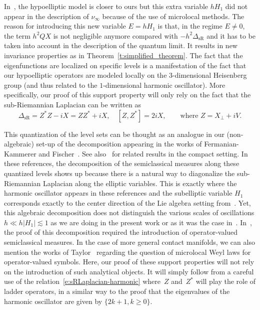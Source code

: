 \documentclass[JEP,XML,SOM,Unicode, NoEqCountersInSection,published]{cedram}
\theoremstyle{plain}
\theoremstyle{definition}
\theoremstyle{remark}
\begin{document}
In~\cite{ColindeVerdiereHillairetTrelat15}, the hypoelliptic model is closer to ours but this extra variable $hH_1$ did not appear in the description of $\nu_\infty$ because of the use of microlocal methods. The reason for introducing this new variable $E=hH_1$ is that, in the regime $E\neq 0$, the term $h^2QX$ is not negligible anymore compared with $-h^2\Delta_{\text{sR}}$ and it has to be taken into account in the description of the quantum limit. It results in new invariance properties as in Theorem~\ref{t:simplified_theorem}. The fact that the eigenfunctions are localized on specific levels is a manifestation of the fact that our hypoelliptic operators are modeled locally on the $3$-dimensional Heisenberg group (and thus related to the $1$\nobreakdash-dimensional harmonic oscillator). More specifically, our proof of this support property will only rely on the fact that the sub-Riemannian Laplacian can be written as
\begin{equation}\label{e:sRLaplacian-harmonic}
\Delta_{\text{sR}}=Z^*Z-iX=ZZ^*+iX,\quad [Z,Z^*]=2iX,\qquad\text{where $Z=X_\perp+i V$.}
\end{equation}

This quantization of the level sets can be thought as an analogue in our (non-algebraic) set-up of the decomposition appearing in the works of Fermanian-Kammerer and Fischer~\cite[Th.\,1.1, Th.\,2.10]{FermanianFischer21}. See also~\cite{FermanianLetrouit20} for related results in the compact setting. In these references, the decomposition of the semiclassical measures along these quantized levels shows up because there is a natural way to diagonalize the sub-Riemannian Laplacian along the elliptic variables. This is exactly where the harmonic oscillator appears in these references and the subelliptic variable $H_1$ corresponds exactly to the center direction of the Lie algebra setting from~\cite{FermanianFischer21, FermanianLetrouit20}. Yet, this algebraic decomposition does not distinguish the various scales of oscillations $h\ll h|H_1|\lesssim 1$ as we are doing in the present work or as it was the case in~\cite{BurqSun22, ArnaizSun22}. In~\cite{FermanianFischer21, FermanianLetrouit20}, the proof of this decomposition required the introduction of operator-valued semiclassical measures. In the case of more general contact manifolds, we can also mention the works of Taylor~\cite{Taylor20} regarding the question of microlocal Weyl laws for operator-valued symbols. Here, our proof of these support properties will not rely on the introduction of such analytical objects. It will simply follow from a careful use of the relation~\eqref{e:sRLaplacian-harmonic} where~$Z$ and~$Z^*$ will play the role of ladder operators, in a similar way to the proof that the eigenvalues of the harmonic oscillator are given by $\{2k+1, k\geq 0\}$.
\end{document}
